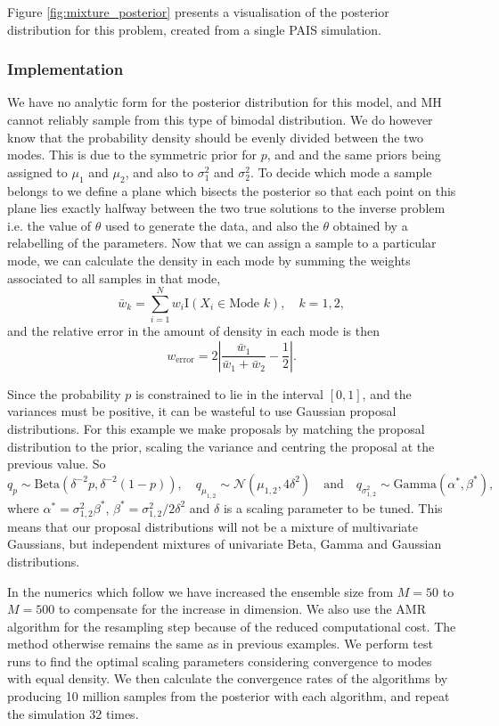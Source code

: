 \documentclass[final]{siamltex}
\begin{document}
Figure \ref{fig:mixture_posterior} presents a visualisation of the posterior distribution for this problem, created from a single PAIS simulation.

\subsubsection{Implementation}\label{sec:mixture_implementation}

We have no analytic form for the posterior distribution for this model, and MH cannot reliably sample from this type of bimodal distribution. We do however know that the probability density should be evenly divided between the two modes. This is due to the symmetric prior for $p$, and and the same priors being assigned to $\mu_1$ and $\mu_2$, and also to $\sigma^2_1$ and $\sigma^2_2$. To decide which mode a sample belongs to we define a plane which bisects the posterior so that each point on this plane lies exactly halfway between the two true solutions to the inverse problem i.e. the value of $\theta$ used to generate the data, and also the $\theta$ obtained by a relabelling of the parameters. Now that we can assign a sample to a particular mode, we can calculate the density in each mode by summing the weights associated to all samples in that mode,
\[
	\bar{w}_k = \sum\limits_{i=1}^N w_i\text{I}(X_i \in \text{Mode $k$}), \quad k = 1, 2,
\]
and the relative error in the amount of density in each mode is then
\[
	w_\text{error} = 2\left|\frac{\bar{w}_1}{\bar{w}_1+\bar{w}_2} - \frac{1}{2}\right|.
\]

Since the probability $p$ is constrained to lie in the interval $[0,1]$, and the variances must be positive, it can be wasteful to use Gaussian proposal distributions. For this example we make proposals by matching the proposal distribution to the prior, scaling the variance and centring the proposal at the previous value. So
\[
	q_p \sim \text{Beta}(\delta^{-2}p, \delta^{-2}(1-p)), \quad q_{\mu_{1,2}} \sim \mathcal{N}(\mu_{1,2}, 4\delta^2) \quad \text{and} \quad q_{\sigma^2_{1,2}} \sim \text{Gamma}(\alpha^*, \beta^*),
\]
where $\alpha^* = \sigma^2_{1,2}\beta^*$, $\beta^* = \sigma^2_{1,2}/2\delta^2$ and $\delta$ is a scaling parameter to be tuned. This means that our proposal distributions will not be a mixture of multivariate Gaussians, but independent mixtures of univariate Beta, Gamma and Gaussian distributions.

In the numerics which follow we have increased the ensemble size from $M=50$ to $M=500$ to compensate for the increase in dimension. We also use the AMR algorithm for the resampling step because of the reduced computational cost. The method otherwise remains the same as in previous examples. We perform test runs to find the optimal scaling parameters considering convergence to modes with equal density. We then calculate the convergence rates of the algorithms by producing 10 million samples from the posterior with each algorithm, and repeat the simulation 32 times.
\end{document}
